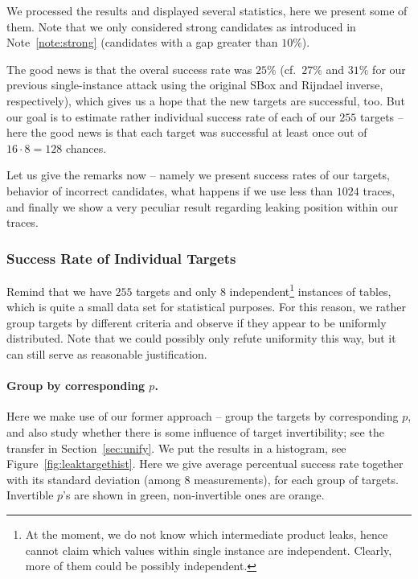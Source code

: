 We processed the results and displayed several statistics, here we present some of them. Note that we only considered strong candidates as introduced in Note~\ref{note:strong} (candidates with a gap greater than $10\%$).

The good news is that the overal success rate was $25\%$ (cf.\ $27\%$ and $31\%$ for our previous single-instance attack using the original SBox and Rijndael inverse, respectively), which gives us a hope that the new targets are successful, too. But our goal is to estimate rather individual success rate of each of our $255$ targets -- here the good news is that each target was successful at least once out of $16\cdot8=128$ chances.

Let us give the remarks now -- namely we present success rates of our targets, behavior of incorrect candidates, what happens if we use less than $1024$ traces, and finally we show a very peculiar result regarding leaking position within our traces.

\subsubsection{Success Rate of Individual Targets}
	
	Remind that we have $255$ targets and only $8$ independent\footnote{At the moment, we do not know which intermediate product leaks, hence cannot claim which values within single instance are independent. Clearly, more of them could be possibly independent.} instances of tables, which is quite a small data set for statistical purposes. For this reason, we rather group targets by different criteria and observe if they appear to be uniformly distributed. Note that we could possibly only refute uniformity this way, but it can still serve as reasonable justification.
	
	\paragraph{Group by corresponding $p$.}
	
	Here we make use of our former approach -- group the targets by corresponding $p$, and also study whether there is some influence of target invertibility; see the transfer in Section~\ref{sec:unify}. We put the results in a histogram, see Figure~\ref{fig:leaktargethist}. Here we give average percentual success rate together with its standard deviation (among $8$ measurements), for each group of targets. Invertible $p$'s are shown in green, non-invertible ones are orange.
	

